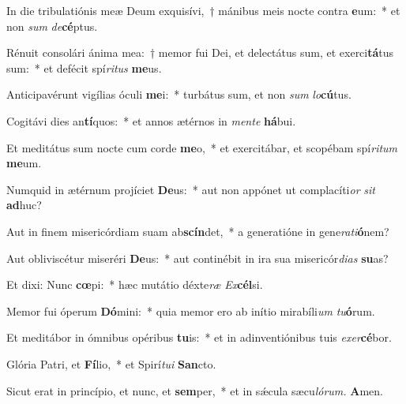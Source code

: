 \item In die tribulatiónis meæ Deum exquisívi,~† mánibus meis nocte contra \textbf{e}um:~* et non \textit{sum} \textit{de}\textbf{cé}ptus.
\item Rénuit consolári ánima mea:~† memor fui Dei, et delectátus sum, et exerci\textbf{tá}tus sum:~* et defécit spí\tinyhspace\textit{ritus} \textbf{me}us.
\item Anticipavérunt vigílias óculi \textbf{me}i:~* turbátus sum, et non \textit{sum} \textit{lo}\textbf{cú}tus.
\item Cogitávi dies an\textbf{tí}quos:~* et annos ætérnos in \textit{mente} \textbf{há}bui.
\item Et meditátus sum nocte cum corde \textbf{me}o,~* et exercitábar, et scopébam spí\textit{ritum} \textbf{me}um.
\item Numquid in ætérnum projíciet \textbf{De}us:~* aut non appónet ut complacíti\tinyhspace\textit{or} \textit{sit} \textbf{ad}huc?
\item Aut in finem misericórdiam suam ab\textbf{scín}det,~* a generatióne in gene\textit{rati}\textbf{ó}nem?
\item Aut obliviscétur miseréri \textbf{De}us:~* aut continébit in ira sua misericór\textit{dias} \textbf{su}as?
\item Et dixi: Nunc \textbf{cœ}pi:~* hæc mutátio déxte\textit{ræ} \textit{Ex}\textbf{cél}si.
\item Memor fui óperum \textbf{Dó}mini:~* quia memor ero ab inítio mirabíli\tinyhspace\textit{um} \textit{tu}\textbf{ó}rum.
\item Et meditábor in ómnibus opéribus \textbf{tu}is:~* et in adinventiónibus tuis \textit{exer}\textbf{cé}bor.
\item Glória Patri, et \textbf{Fí}lio,~* et Spirí\tinyhspace\textit{tui} \textbf{San}cto.
\item Sicut erat in princípio, et nunc, et \textbf{sem}per,~* et in sǽcula sæcu\tinyhspace\textit{lórum.} \textbf{A}men.
